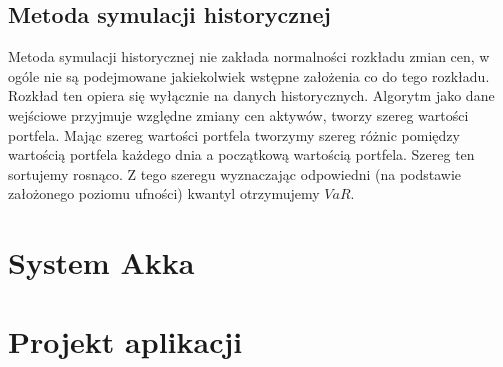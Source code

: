 \documentclass[11pt,titlepage]{article}
\numberwithin{equation}{section}
\begin{document}
\subsection{Metoda symulacji historycznej}



Metoda symulacji historycznej nie zakłada normalności rozkładu zmian cen, w ogóle nie są podejmowane jakiekolwiek wstępne założenia co do tego rozkładu. Rozkład ten opiera się wyłącznie na danych historycznych. Algorytm jako dane wejściowe przyjmuje względne zmiany cen aktywów, tworzy szereg wartości portfela. Mając szereg wartości portfela tworzymy szereg różnic pomiędzy wartością portfela każdego dnia a początkową wartością portfela. Szereg ten sortujemy rosnąco. Z tego szeregu wyznaczając odpowiedni (na podstawie założonego poziomu ufności) kwantyl otrzymujemy $VaR$.\\









 











\newpage
\section{System Akka}


\section{Projekt aplikacji}


\newpage
\end{document}
